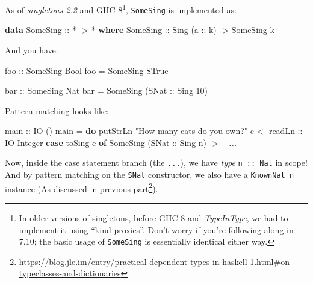 \documentclass[]{article}
\newenvironment{Shaded}{\begin{snugshade}}{\end{snugshade}}
\newcommand{\CommentTok}[1]{\textcolor[rgb]{0.56,0.35,0.01}{\textit{#1}}}
\newcommand{\DataTypeTok}[1]{\textcolor[rgb]{0.13,0.29,0.53}{#1}}
\newcommand{\DecValTok}[1]{\textcolor[rgb]{0.00,0.00,0.81}{#1}}
\newcommand{\FunctionTok}[1]{\textcolor[rgb]{0.00,0.00,0.00}{#1}}
\newcommand{\KeywordTok}[1]{\textcolor[rgb]{0.13,0.29,0.53}{\textbf{#1}}}
\newcommand{\NormalTok}[1]{#1}
\newcommand{\OtherTok}[1]{\textcolor[rgb]{0.56,0.35,0.01}{#1}}
\newcommand{\StringTok}[1]{\textcolor[rgb]{0.31,0.60,0.02}{#1}}
\renewcommand{\href}[2]{#2\footnote{\url{#1}}}
\begin{document}
As of \emph{singletons-2.2} and GHC 8\footnote{In older versions of singletons,
  before GHC 8 and \emph{TypeInType}, we had to implement it using ``kind
  proxies''. Don't worry if you're following along in 7.10; the basic usage of
  \texttt{SomeSing} is essentially identical either way.}, \texttt{SomeSing} is
implemented as:

\begin{Shaded}
\begin{Highlighting}[]
\KeywordTok{data} \DataTypeTok{SomeSing}\OtherTok{ ::} \FunctionTok{*} \OtherTok{->} \FunctionTok{*} \KeywordTok{where}
    \DataTypeTok{SomeSing}\OtherTok{ ::} \DataTypeTok{Sing}\NormalTok{ (}\OtherTok{a ::}\NormalTok{ k) }\OtherTok{->} \DataTypeTok{SomeSing}\NormalTok{ k}
\end{Highlighting}
\end{Shaded}

And you have:

\begin{Shaded}
\begin{Highlighting}[]
\OtherTok{foo ::} \DataTypeTok{SomeSing} \DataTypeTok{Bool}
\NormalTok{foo }\FunctionTok{=} \DataTypeTok{SomeSing} \DataTypeTok{STrue}

\OtherTok{bar ::} \DataTypeTok{SomeSing} \DataTypeTok{Nat}
\NormalTok{bar }\FunctionTok{=} \DataTypeTok{SomeSing}\NormalTok{ (}\DataTypeTok{SNat}\OtherTok{ ::} \DataTypeTok{Sing} \DecValTok{10}\NormalTok{)}
\end{Highlighting}
\end{Shaded}

Pattern matching looks like:

\begin{Shaded}
\begin{Highlighting}[]
\OtherTok{main ::} \DataTypeTok{IO}\NormalTok{ ()}
\NormalTok{main }\FunctionTok{=} \KeywordTok{do}
\NormalTok{    putStrLn }\StringTok{"How many cats do you own?"}
\NormalTok{    c }\OtherTok{<- readLn ::} \DataTypeTok{IO} \DataTypeTok{Integer}
    \KeywordTok{case}\NormalTok{ toSing c }\KeywordTok{of}
      \DataTypeTok{SomeSing}\NormalTok{ (}\DataTypeTok{SNat}\OtherTok{ ::} \DataTypeTok{Sing}\NormalTok{ n) }\OtherTok{->} \CommentTok{-- ...}
\end{Highlighting}
\end{Shaded}

Now, inside the case statement branch (the \texttt{...}), we have \emph{type}
\texttt{n\ ::\ Nat} in scope! And by pattern matching on the \texttt{SNat}
constructor, we also have a \texttt{KnownNat\ n} instance (As discussed in
\href{https://blog.jle.im/entry/practical-dependent-types-in-haskell-1.html\#on-typeclasses-and-dictionaries}{previous
part}).
\end{document}

